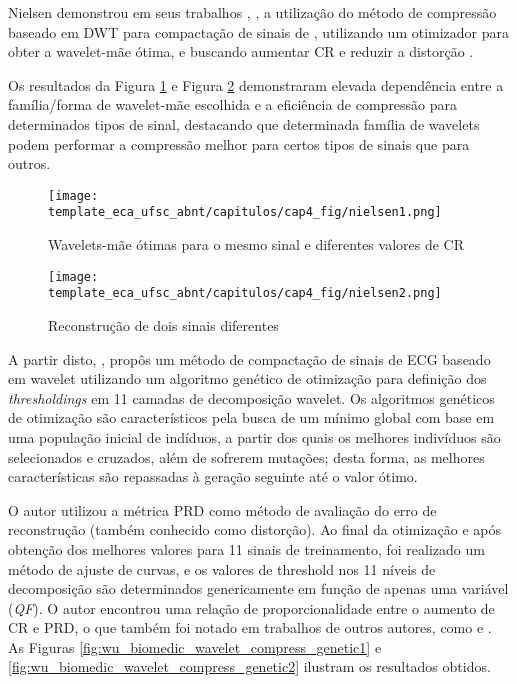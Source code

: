 Nielsen demonstrou em seus trabalhos \cite{art:nielsen_biomedical_wavelet1}, \cite{art:nielsen_biomedical_wavelet2}, a utilização do método de compressão baseado em \gls{DWT} para compactação de sinais de , utilizando um otimizador para obter a wavelet-mãe ótima, e buscando aumentar \gls{CR} e reduzir a distorção .

Os resultados da Figura \ref{fig:nielsen1} e Figura \ref{fig:nielsen2} demonstraram elevada dependência entre a família/forma de wavelet-mãe escolhida e a eficiência de compressão para determinados tipos de sinal, destacando que determinada família de wavelets podem performar a compressão melhor para certos tipos de sinais que para outros.

\begin{figure}[htb]
	\caption{Wavelets-mãe ótimas para o mesmo sinal e diferentes valores de \gls{CR}}
	\begin{center}
		\texttt{[image: template\_eca\_ufsc\_abnt/capitulos/cap4\_fig/nielsen1.png]}
	\end{center}
	\label{fig:nielsen1}
\end{figure}

\begin{figure}[htb]
	\caption{Reconstrução de dois sinais diferentes}
	\begin{center}
		\texttt{[image: template\_eca\_ufsc\_abnt/capitulos/cap4\_fig/nielsen2.png]}
	\end{center}
	\label{fig:nielsen2}
\end{figure}


A partir disto, \cite{art:wu_biomedic_wavelet_compress_genetic}, propôs um método de compactação de sinais de \gls{ECG} baseado em wavelet utilizando um algoritmo genético de otimização para definição dos \textit{thresholdings} em 11 camadas de decomposição wavelet. Os algoritmos genéticos de otimização são característicos pela busca de um mínimo global com base em uma população inicial de indíduos, a partir dos quais os melhores indivíduos são selecionados e cruzados, além de sofrerem mutações; desta forma, as melhores características são repassadas à geração seguinte até o valor ótimo. 

O autor utilizou a métrica \gls{PRD} como método de avaliação do erro de reconstrução (também conhecido como distorção). Ao final da otimização e após obtenção dos melhores valores para 11 sinais de treinamento, foi realizado um método de ajuste de curvas, e os valores de threshold nos 11 níveis de decomposição são determinados genericamente em função de apenas uma variável (\textit{QF}). O autor encontrou uma relação de proporcionalidade entre o aumento de \gls{CR} e \gls{PRD}, o que também foi notado em trabalhos de outros autores, como \cite{art:nielsen_biomedical_wavelet1} e \cite{art:nielsen_biomedical_wavelet2}. As Figuras \ref{fig:wu_biomedic_wavelet_compress_genetic1} e \ref{fig:wu_biomedic_wavelet_compress_genetic2} ilustram os resultados obtidos.

